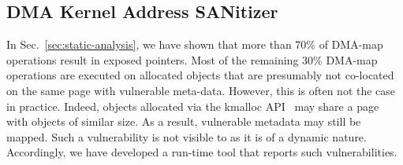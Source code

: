 \subsection{DMA Kernel Address SANitizer}\label{sec:dma-kasan} 

In Sec.~\ref{sec:static-analysis}, we have shown that more than 70\% of DMA-map operations result in exposed pointers. 
Most of the remaining 30\% DMA-map operations are executed on allocated objects that are presumably not co-located on the same page with vulnerable meta-data. However, this is often not the case in practice.
Indeed, objects allocated via the kmalloc API~\cite{Cor07} may share a page with objects of similar size. As a result, vulnerable metadata may still be mapped. 
%
Such a vulnerability is not visible to \tool as it is of a dynamic nature. Accordingly, we have developed a run-time tool that reports such vulnerabilities. 

